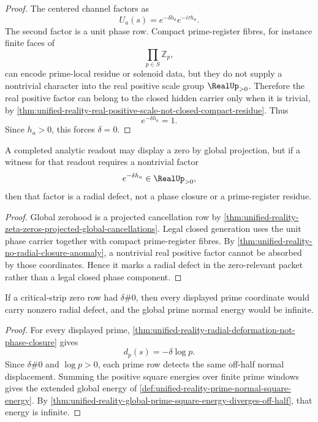 \begin{proof}
The centered channel factors as
$$
U_a(s)=e^{-\delta h_a}e^{-i\tau h_a}.
$$
The second factor is a unit phase row.  Compact prime-register fibres,
for instance finite faces of
$$
\prod_{p\in S}\mathbb Z_p,
$$
can encode prime-local residue or solenoid data, but they do not supply
a nontrivial character into the real positive scale group
$\RealUp_{>0}$.  Therefore the real positive factor can belong to the
closed hidden carrier only when it is trivial, by
\autoref{thm:unified-reality-real-positive-scale-not-closed-compact-residue}.
Thus
$$
e^{-\delta h_a}=1.
$$
Since $h_a>0$, this forces $\delta=0$.
\end{proof}

\begin{corollary}
\label{cor:unified-reality-projected-cancellation-not-radial-closure}
A completed analytic readout may display a zero by global projection,
but if a witness for that readout requires a nontrivial factor
$$
e^{-\delta h_a}\in\RealUp_{>0},
$$
then that factor is a radial defect, not a phase closure or a
prime-register residue.
\end{corollary}

\begin{proof}
Global zerohood is a projected cancellation row by
\autoref{thm:unified-reality-zeta-zeros-projected-global-cancellations}.
Legal closed generation uses the unit phase carrier together with compact
prime-register fibres.  By
\autoref{thm:unified-reality-no-radial-closure-anomaly}, a nontrivial
real positive factor cannot be absorbed by those coordinates.  Hence it
marks a radial defect in the zero-relevant packet rather than a legal
closed phase component.
\end{proof}

\begin{corollary}
\label{cor:unified-reality-off-half-zero-rows-all-prime-radial-energy}
If a critical-strip zero row had $\delta\#0$, then every displayed prime
coordinate would carry nonzero radial defect, and the global prime
normal energy would be infinite.
\end{corollary}

\begin{proof}
For every displayed prime,
\autoref{thm:unified-reality-radial-deformation-not-phase-closure} gives
$$
d_p(s)=-\delta\log p.
$$
Since $\delta\#0$ and $\log p>0$, each prime row detects the same
off-half normal displacement.  Summing the positive square energies over
finite prime windows gives the extended global energy of
\autoref{def:unified-reality-prime-normal-square-energy}.  By
\autoref{thm:unified-reality-global-prime-square-energy-diverges-off-half},
that energy is infinite.
\end{proof}

